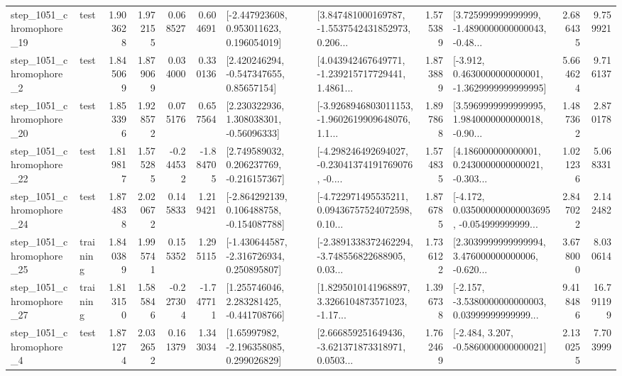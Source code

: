 \begin{tabular}{llrrrrllrlrr}
 step\_1051\_chromophore\_19 &      test &      1.903628 &    1.972155 &      0.068527 &  0.604691 &    [-2.447923608, 0.953011623, 0.196054019] &  [3.847481000169787, -1.5537542431852973, 0.206... &       1.575389 &  [3.725999999999999, -1.4890000000000043, -0.48... &            2.686435 &          9.759921 \\
  step\_1051\_chromophore\_2 &      test &      1.845069 &    1.879069 &      0.034000 &  0.330136 &     [2.420246294, -0.547347655, 0.85657154] &  [4.043942467649771, -1.239215717729441, 1.4861... &       1.873889 &  [-3.912, 0.4630000000000001, -1.3629999999999995] &            5.664624 &          9.716137 \\
 step\_1051\_chromophore\_20 &      test &      1.853396 &    1.928572 &      0.075176 &  0.657564 &     [2.230322936, 1.308038301, -0.56096333] &  [-3.9268946803011153, -1.9602619909648076, 1.1... &       1.897868 &  [3.5969999999999995, 1.9840000000000018, -0.90... &            1.487362 &          2.870178 \\
 step\_1051\_chromophore\_22 &      test &      1.819817 &    1.575285 &     -0.244532 & -1.884705 &    [2.749589032, 0.206237769, -0.216157367] &  [-4.298246492694027, -0.23041374191769076, -0.... &       1.574835 &  [4.186000000000001, 0.2430000000000021, -0.303... &            1.021236 &          5.068331 \\
 step\_1051\_chromophore\_24 &      test &      1.874838 &    2.020672 &      0.145833 &  1.219421 &   [-2.864292139, 0.106488758, -0.154087788] &  [-4.722971495535211, 0.09436757524072598, 0.10... &       1.876785 &  [-4.172, 0.035000000000003695, -0.054999999999... &            2.847022 &          2.142482 \\
 step\_1051\_chromophore\_25 &  training &      1.840389 &    1.995741 &      0.155352 &  1.295115 &   [-1.430644587, -2.316726934, 0.250895807] &  [-2.3891338372462294, -3.748556822688905, 0.03... &       1.736122 &  [2.3039999999999994, 3.476000000000006, -0.620... &            3.678000 &          8.030614 \\
 step\_1051\_chromophore\_27 &  training &      1.813150 &    1.585846 &     -0.227304 & -1.747711 &    [1.255746046, 2.283281425, -0.441708766] &  [1.8295010141968897, 3.3266104873571023, -1.17... &       1.396738 &  [-2.157, -3.5380000000000003, 0.03999999999999... &            9.418486 &         16.791199 \\
  step\_1051\_chromophore\_4 &      test &      1.871274 &    2.032652 &      0.161379 &  1.343034 &     [1.65997982, -2.196358085, 0.299026829] &  [2.666859251649436, -3.621371873318971, 0.0503... &       1.762469 &               [-2.484, 3.207, -0.5860000000000021] &            2.130255 &          7.703999 \\

\end{tabular}
